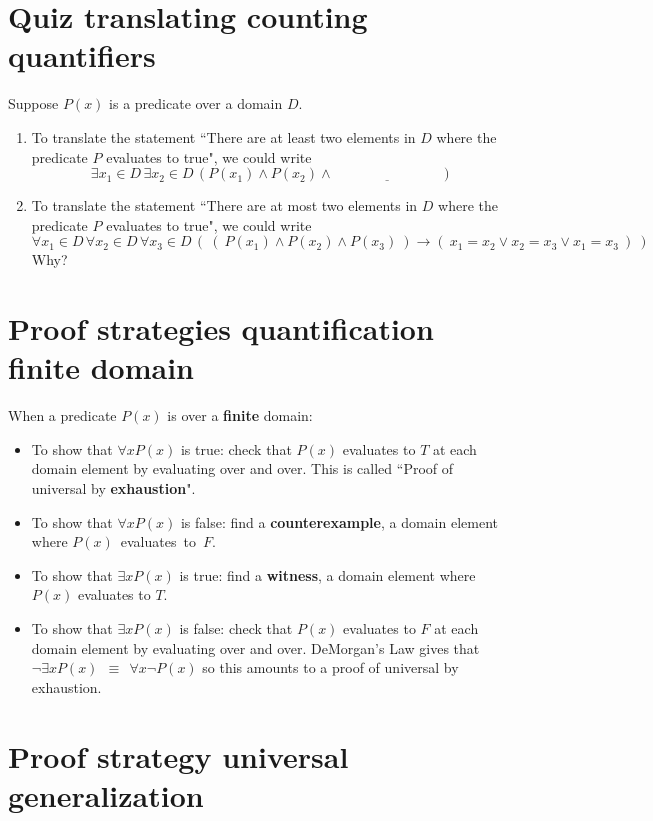 \documentclass[12pt, oneside]{article}
\begin{document}
\section*{Quiz translating counting quantifiers}


Suppose $P(x)$ is  a predicate over a domain $D$.
\begin{enumerate}
    \item To translate the statement
    ``There are at least two  elements in $D$
    where the predicate $P$ evaluates to true", we
    could  write
    \[
    \exists  x_1 \in D \, \exists x_2 \in D  \, (P(x_1) \wedge P(x_2) \wedge \underline{\phantom{\text{FILL IN BLANK}}})
    \]
    \vfill
    \item  To translate the statement
    ``There are at most two  elements in $D$
    where the predicate $P$ evaluates to true", we
    could write
    \[
    \forall  x_1 \in D \, \forall x_2 \in D \, \forall x_3 \in  D \, \left(~ (~P(x_1) \wedge P(x_2)  \wedge P(x_3) ~) \to (~ x_1 = x_2 \vee x_2 = x_3 \vee x_1 = x_3~)~\right)
    \]
    Why?
    \vfill
\end{enumerate} \vfill
\section*{Proof strategies quantification finite domain}


When a predicate $P(x)$ is over a {\bf finite} domain:
\begin{itemize}
\item To show that $\forall x  P(x)$ is true: check that $P(x)$ evaluates to $T$ at each domain element by evaluating over and over. 
This is called ``Proof of universal by {\bf exhaustion}".
\item To show that $\forall x  P(x)$ is false: find a {\bf counterexample}, a domain element where $P(x)$~evaluates~to~$F$.
\item To show that $\exists x  P(x)$ is true: find a {\bf witness}, a domain element where $P(x)$ evaluates to $T$.
\item To show that $\exists x  P(x)$ is false: check that $P(x)$ evaluates to $F$ at each domain element by evaluating over and over.
DeMorgan's Law gives that $\lnot \exists x P(x) ~~\equiv~~ \forall x \lnot P(x)$ so this amounts to a proof of universal by exhaustion.
\end{itemize} \vfill
\section*{Proof strategy universal generalization}
\end{document}
